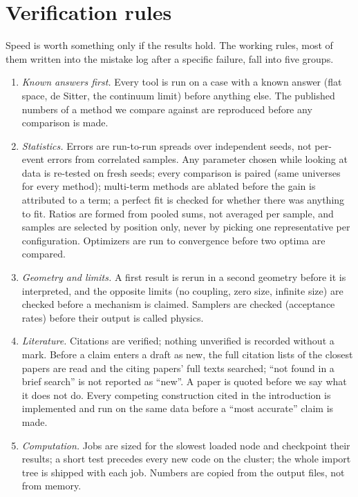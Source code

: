 \documentclass[11pt,a4paper]{article}
\begin{document}
\section{Verification rules}\label{sec:checks}
Speed is worth something only if the results hold. The working rules, most of them written into the mistake log after a specific failure, fall into five groups.
\begin{enumerate}[leftmargin=*,itemsep=2pt]
\item \emph{Known answers first.} Every tool is run on a case with a known answer (flat space, de Sitter, the continuum limit) before anything else. The published numbers of a method we compare against are reproduced before any comparison is made.
\item \emph{Statistics.} Errors are run-to-run spreads over independent seeds, not per-event errors from correlated samples. Any parameter chosen while looking at data is re-tested on fresh seeds; every comparison is paired (same universes for every method); multi-term methods are ablated before the gain is attributed to a term; a perfect fit is checked for whether there was anything to fit. Ratios are formed from pooled sums, not averaged per sample, and samples are selected by position only, never by picking one representative per configuration. Optimizers are run to convergence before two optima are compared.
\item \emph{Geometry and limits.} A first result is rerun in a second geometry before it is interpreted, and the opposite limits (no coupling, zero size, infinite size) are checked before a mechanism is claimed. Samplers are checked (acceptance rates) before their output is called physics.
\item \emph{Literature.} Citations are verified; nothing unverified is recorded without a mark. Before a claim enters a draft as new, the full citation lists of the closest papers are read and the citing papers' full texts searched; ``not found in a brief search'' is not reported as ``new''. A paper is quoted before we say what it does not do. Every competing construction cited in the introduction is implemented and run on the same data before a ``most accurate'' claim is made.
\item \emph{Computation.} Jobs are sized for the slowest loaded node and checkpoint their results; a short test precedes every new code on the cluster; the whole import tree is shipped with each job. Numbers are copied from the output files, not from memory.
\end{enumerate}
\end{document}
